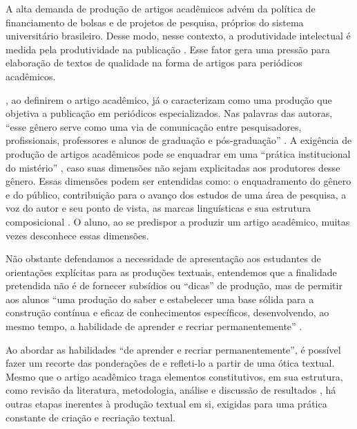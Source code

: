 A alta demanda de produção de artigos acadêmicos advém da política de
financiamento de bolsas e de projetos de pesquisa, próprios do sistema
universitário brasileiro. Desse modo, nesse contexto, a produtividade
intelectual é medida pela produtividade na publicação \cite{motta-roth2010}. Esse fator gera uma pressão para elaboração de textos de
qualidade na forma de artigos para periódicos acadêmicos.

\textcite{motta-roth2010}, ao definirem o artigo acadêmico, já o
caracterizam como uma produção que objetiva a publicação em periódicos
especializados. Nas palavras das autoras, ``esse gênero serve como uma
via de comunicação entre pesquisadores, profissionais, professores e
alunos de graduação e pós-graduação'' \cite[p.~65]{motta-roth2010}. A exigência de produção de artigos acadêmicos pode se enquadrar em
uma ``prática institucional do mistério'' \cite{lillis1999}, caso suas
dimensões não sejam explicitadas aos produtores desse gênero. Essas
dimensões podem ser entendidas como: o enquadramento do gênero e do
público, contribuição para o avanço dos estudos de uma área de pesquisa,
a voz do autor e seu ponto de vista, as marcas linguísticas e sua
estrutura composicional \cite{street2010}. O aluno, ao se predispor a
produzir um artigo acadêmico, muitas vezes desconhece essas dimensões.

Não obstante defendamos a necessidade de apresentação aos estudantes de
orientações explícitas para as produções textuais, entendemos que a
finalidade pretendida não é de fornecer subsídios ou ``dicas'' de
produção, mas de permitir aos alunos ``uma produção do saber e
estabelecer uma base sólida para a construção contínua e eficaz de
conhecimentos específicos, desenvolvendo, ao mesmo tempo, a habilidade
de aprender e recriar permanentemente'' \cite[p.~48]{fischer2007}.

Ao abordar as habilidades ``de aprender e recriar permanentemente'', é
possível fazer um recorte das ponderações de \textcite{fischer2007} e refleti-lo
a partir de uma ótica textual. Mesmo que o artigo acadêmico traga
elementos constitutivos, em sua estrutura, como revisão da literatura,
metodologia, análise e discussão de resultados \cite{motta-roth2010}, há outras etapas inerentes à produção textual em si, exigidas
para uma prática constante de criação e recriação textual.


